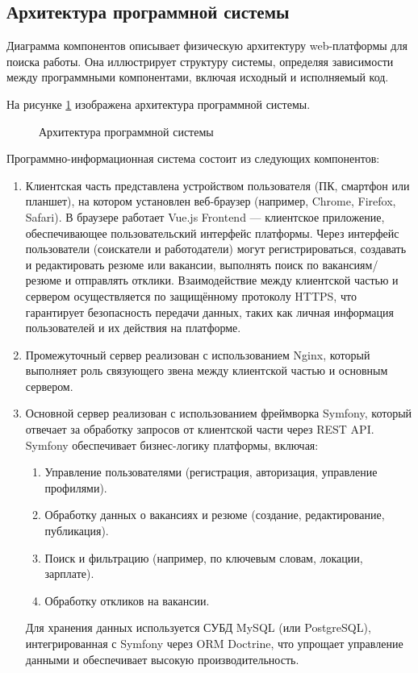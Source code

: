 \subsection{Архитектура программной системы}

Диаграмма компонентов описывает физическую архитектуру web-платформы для поиска работы. Она иллюстрирует структуру системы, определяя зависимости между программными компонентами, включая исходный и исполняемый код.

На рисунке \ref{dc:image} изображена архитектура программной системы.

\begin{figure}[ht]
\center{\texttt{[image: dc]}}
\caption{Архитектура программной системы}
\label{dc:image}
\end{figure}

Программно-информационная система состоит из следующих компонентов:

\begin{enumerate}
	\item Клиентская часть представлена устройством пользователя (ПК, смартфон или планшет), на котором установлен веб-браузер (например, Chrome, Firefox, Safari). В браузере работает Vue.js Frontend — клиентское приложение, обеспечивающее пользовательский интерфейс платформы. Через интерфейс пользователи (соискатели и работодатели) могут регистрироваться, создавать и редактировать резюме или вакансии, выполнять поиск по вакансиям/резюме и отправлять отклики. Взаимодействие между клиентской частью и сервером осуществляется по защищённому протоколу HTTPS, что гарантирует безопасность передачи данных, таких как личная информация пользователей и их действия на платформе.
	\item Промежуточный сервер реализован с использованием Nginx, который выполняет роль связующего звена между клиентской частью и основным сервером.
	\item Основной сервер реализован с использованием фреймворка Symfony, который отвечает за обработку запросов от клиентской части через REST API. Symfony обеспечивает бизнес-логику платформы, включая:
	\begin{enumerate}
		\item Управление пользователями (регистрация, авторизация, управление профилями).
		\item Обработку данных о вакансиях и резюме (создание, редактирование, публикация).
		\item Поиск и фильтрацию (например, по ключевым словам, локации, зарплате).
		\item Обработку откликов на вакансии.
	\end{enumerate}
	Для хранения данных используется СУБД MySQL (или PostgreSQL), интегрированная с Symfony через ORM Doctrine, что упрощает управление данными и обеспечивает высокую производительность.
\end{enumerate}

